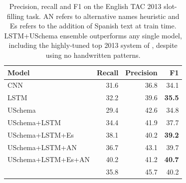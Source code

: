 \begin{table}[t!]
\setlength{\tabcolsep}{4.1pt}
\begin{center}
\begin{tabular}{|lrrr|}
\hline
\bf Model & \bf Recall & \bf Precision & \bf F1 \\
\hline\hline
CNN                 & 31.6 & 36.8 & 34.1 \\
LSTM                & 32.2 & 39.6 & \bf 35.5  \\
USchema             & 29.4 & 42.6 & 34.8 \\
\hline\hline
USchema+LSTM        & 34.4 & 41.9 & 37.7 \\
USchema+LSTM+Es        & 38.1 & 40.2 & \bf 39.2 \\
\hline\hline
USchema+LSTM+AN	& 36.7 & 43.1 & 39.7 \\
USchema+LSTM+Es+AN & 40.2 & 41.2 & \bf 40.7 \\
\citet{roth2014relationfactory} & 35.8 & 45.7 & 40.2 \\

\hline
\end{tabular}
\caption{Precision, recall and F1 on the English TAC 2013 slot-filling task. AN refers to alternative names heuristic and Es refers to the addition of Spanish text at train time. LSTM+USchema ensemble outperforms any single model, including the highly-tuned top 2013 system of \protect\citet{roth2014relationfactory}, despite using no handwritten patterns.  %
\label{en-tac-table}}
\end{center}
\vspace{-.3cm}
\end{table}
%
%

